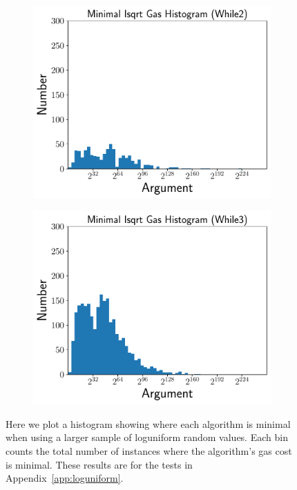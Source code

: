 \begin{figure}[p]
    \begin{subfigure}[t]{0.45\textwidth}
    \includegraphics[width=\textwidth]{plots/minimal_hist_While2_er.pdf}
    \end{subfigure}
    \begin{subfigure}[t]{0.45\textwidth}
    \includegraphics[width=\textwidth]{plots/minimal_hist_While3_er.pdf}
    \end{subfigure}
    \caption{Here we plot a histogram showing where each algorithm is minimal
        when using a larger sample of loguniform random values.
        Each bin counts the total number of instances where the algorithm's
        gas cost is minimal.
        These results are for the tests in Appendix~\ref{app:loguniform}.
        }
    \label{fig:minimal_gas_hist_er}
\end{figure}
